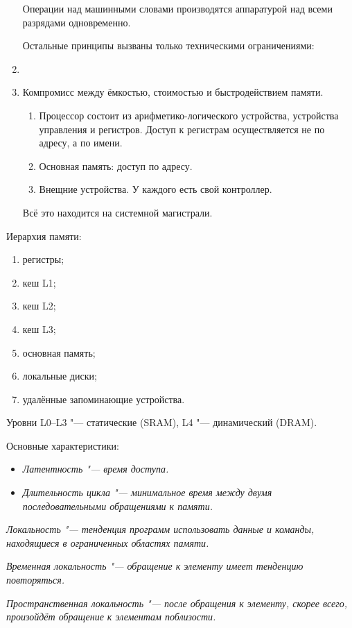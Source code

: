 \begin{enumerate}
	Операции над машинными словами производятся аппаратурой над всеми разрядами одновременно.

	Остальные принципы вызваны только техническими ограничениями:

	\item {}

	\item {}

	Компромисс между ёмкостью, стоимостью и быстродействием памяти.

	\begin{enumerate}
		\item Процессор состоит из арифметико-логического устройства, устройства управления и регистров. Доступ к регистрам осуществляется не по адресу, а по имени.

		\item Основная память: доступ по адресу.

		\item Внещние устройства. У каждого есть свой контроллер.
	\end{enumerate}
	Всё это находится на системной магистрали.
\end{enumerate}

Иерархия памяти:

\begin{enumerate}
	\item[\bt{L0.}] регистры;
	\item[\bt{L1.}] кеш L1;
	\item[\bt{L2.}] кеш L2;
	\item[\bt{L3.}] кеш L3;
	\item[\bt{L4.}] основная память;
	\item[\bt{L5.}] локальные диски;
	\item[\bt{L6.}] удалённые запоминающие устройства.
\end{enumerate}

Уровни L0--L3 "--- статические (SRAM), L4 "--- динамический (DRAM).

Основные характеристики:
\begin{itemize}
	\item \it{Латентность} "--- время доступа.
	\item \it{Длительность цикла} "--- минимальное время между двумя последовательными обращениями к памяти.
\end{itemize}

\begin{definition}
	\it{Локальность} "--- тенденция программ использовать данные и команды, находящиеся в ограниченных областях памяти.

	\it{Временная локальность} "--- обращение к элементу имеет тенденцию повторяться.

	\it{Пространственная локальность} "--- после обращения к элементу, скорее всего, произойдёт обращение к элементам поблизости.
\end{definition}
